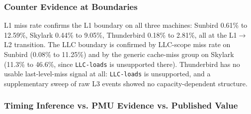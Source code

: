 \documentclass{article}
\begin{document}
\subsubsection{Counter Evidence at Boundaries}
L1 miss rate confirms the L1 boundary on all three machines: Sunbird 0.61\% to 12.59\%, Skylark 0.44\% to 9.05\%, Thunderbird 0.18\% to 2.81\%, all at the L1$\to$L2 transition. The LLC boundary is confirmed by LLC-scope miss rate on Sunbird (0.08\% to 11.25\%) and by the generic cache-miss group on Skylark (11.3\% to 46.6\%, since \texttt{LLC-loads} is unsupported there). Thunderbird has no usable last-level-miss signal at all: \texttt{LLC-loads} is unsupported, and a supplementary sweep of raw L3 events showed no capacity-dependent structure.

\subsubsection{Timing Inference vs. PMU Evidence vs. Published Value}
\end{document}
